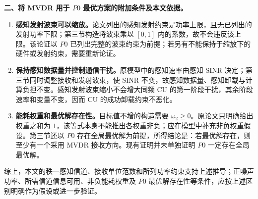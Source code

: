 \noindent\textbf{二、将 MVDR 用于 $P0$ 最优方案的附加条件及本文依据。}
\begin{enumerate}[label=\textbf{(\arabic*)},leftmargin=*]
\item \textbf{感知发射波束可以缩放。}论文列出的感知发射约束是功率上限，且无已列出的发射功率下限；第三节构造将波束乘以 $[0,1]$ 内的系数，故不会违反该上限。该论证以 $P0$ 已列出完整的波束约束为前提；若另有不能保持于缩放下的硬件或发射约束，需要重新论证。
\item \textbf{保持感知数据量并控制通信干扰。}原模型中的感知速率由感知 SINR 决定；第三节同时调整接收和发射波束，使 SINR 不变，故感知数据量、感知卸载与计算负担不变。感知发射波束缩小不会增大同频 CU 的第一阶段干扰，其余阶段速率和变量不变，因而 CU 的成功卸载约束不恶化。
\item \textbf{能耗权重和最优解存在性。}目标值不增的构造需要 $\omega_2\ge0$。原论文只明确给出权重之和为 $1$，该等式本身不能推出各权重非负；应在模型中补充非负权重假设。第三节还以 $P0$ 存在全局最优解为前提，所得结论是：若最优解存在，则至少有一个采用 MVDR 接收方向。现有证明并未单独证明 $P0$ 一定存在全局最优解。
\end{enumerate}

综上，本文的秩一感知信道、接收单位范数和所列功率约束支持上述推导；正噪声功率、所需信道信息可用、非负能耗权重及 $P0$ 最优解存在性等条件，应按上述区别明确作为假设或进一步验证。
